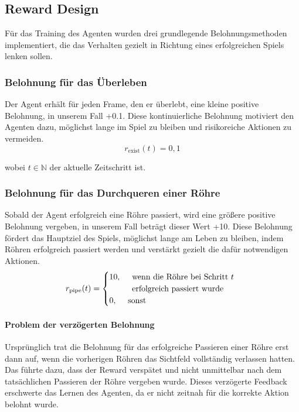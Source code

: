 \documentclass[conference]{IEEEtran}
\begin{document}
\subsection{Reward Design}\label{reward_design}
Für das Training des Agenten wurden drei grundlegende Belohnungsmethoden implementiert, die das Verhalten gezielt in Richtung eines erfolgreichen Spiels lenken sollen.\\

\subsubsection{Belohnung für das Überleben}\label{reward_design_first}
Der Agent erhält für jeden Frame, den er überlebt, eine kleine positive Belohnung, in unserem Fall +0.1. Diese kontinuierliche Belohnung motiviert den Agenten dazu, möglichst lange im Spiel zu bleiben und risikoreiche Aktionen zu vermeiden.
\begin{equation}
	r_{\text{exist}}(t) = 0{,}1
\end{equation}

wobei \( t \in \mathbb{N} \) der aktuelle Zeitschritt ist.\\

\subsubsection{Belohnung für das Durchqueren einer Röhre}\label{reward_design_second}
Sobald der Agent erfolgreich eine Röhre passiert, wird eine größere positive Belohnung vergeben, in unserem Fall beträgt dieser Wert +10. Diese Belohnung fördert das Hauptziel des Spiels, möglichst lange am Leben zu bleiben, indem Röhren erfolgreich passiert werden und verstärkt gezielt die dafür notwendigen Aktionen.
\begin{equation}
	r_{\text{pipe}}(t) =
	\begin{cases}
		10, & \begin{array}[t]{l}
			\text{wenn die Röhre bei Schritt } t \\
			\text{erfolgreich passiert wurde}
		\end{array} \\
		0, & \text{sonst}
	\end{cases}
\end{equation}

\paragraph{Problem der verzögerten Belohnung}
Ursprünglich trat die Belohnung für das erfolgreiche Passieren einer Röhre erst dann auf, wenn die vorherigen Röhren das Sichtfeld vollständig verlassen hatten. Das führte dazu, dass der Reward verspätet und nicht unmittelbar nach dem tatsächlichen Passieren der Röhre vergeben wurde. Dieses verzögerte Feedback erschwerte das Lernen des Agenten, da er nicht zeitnah für die korrekte Aktion belohnt wurde.
\end{document}
